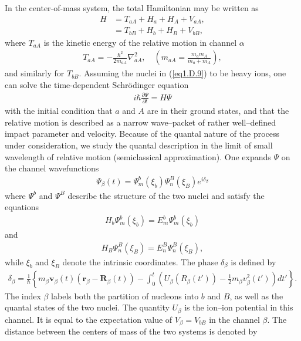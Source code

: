 \begin{subappendices}
In the center-of-mass system, the total Hamiltonian may be written as 
\begin{align}\label{eq1.D.10}
\nonumber H&=T_{aA}+H_a+H_A+V_{aA},\\
&=T_{bB}+H_b+H_B+V_{bB},
\end{align}
where $T_{aA}$ is the kinetic energy of the relative motion in channel $\alpha$
\begin{align}\label{eq1.D.11}
T_{aA}=-\frac{\hbar^2}{2m_{aA}}\nabla^2_{aA},\quad (m_{aA}=\frac{m_am_A}{m_a+m_A}),
\end{align}
and similarly for $T_{bB}$. Assuming the nuclei in (\ref{eq1.D.9}) to be heavy ions, one can solve the time-dependent Schr\"odinger equation
\begin{align}\label{eq1.D.12}
i\hbar\frac{\partial\Psi}{\partial t}=H\Psi
\end{align}
with the initial condition that $a$ and $A$ are in their ground states, and that the relative motion is described as a narrow wave--packet of rather well--defined impact parameter and velocity. Because of the quantal nature of the process under consideration, we study the quantal description in the limit of small wavelength of relative motion (semiclassical approximation). One expands $\Psi$ on the channel wavefunctions
\begin{align}\label{eq1.D.13}
\Psi_\beta(t)=\Psi_m^b(\xi_b)\Psi_n^B(\xi_B)e^{i\delta_\beta}
\end{align}
where $\Psi^b$ and $\Psi^B$ describe the structure of the two nuclei and satisfy the equations 
\begin{align}\label{eq1.D.14}
H_b\Psi_m^b(\xi_b)=E_m^b\Psi_m^b(\xi_b)
\end{align}
and
\begin{align}\label{eq1.D.15}
H_B\Psi_n^B(\xi_B)=E_n^B\Psi_n^B(\xi_B),
\end{align}
while $\xi_b$ and $\xi_B$ denote the intrinsic coordinates. The phase $\delta_\beta$ is defined by
\begin{align}\label{eq1.D.16}
\delta_\beta=\frac{1}{\hbar}\left\{m_\beta\mathbf v_\beta(t)(\mathbf r_\beta-\mathbf R_\beta(t))-\int_0^t\left(U_\beta(R_\beta(t'))-\frac{1}{2}m_\beta v^2_\beta(t')\right)dt'\right\}.
\end{align}
The index $\beta$ labels both the partition of nucleons into $b$ and $B$, as well as the quantal states of the two nuclei. The quantity $U_\beta$ is the ion--ion potential in this channel. It is equal to the expectation value of $V_\beta=V_{bB}$ in the channel $\beta$. The distance between the centers of mass of the two systems is denoted by

\end{subappendices}
